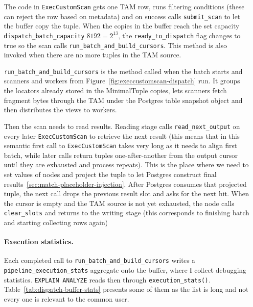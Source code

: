 \endgroup

The code in \texttt{ExecCustomScan} gets one TAM row, runs filtering conditions (these can reject the row based on metadata) and on success calls \texttt{submit\_scan} to let the buffer copy the tuple.
When the copies in the buffer reach the set capacity \texttt{dispatch\_batch\_capacity} \(8192 = 2^{13}\), the \texttt{ready\_to\_dispatch} flag changes to true so the scan calls \texttt{run\_batch\_and\_build\_cursors}.
This method is also invoked when there are no more tuples in the TAM source.

\texttt{run\_batch\_and\_build\_cursors} is the method called when the batch starts and scanners and workers from Figure~\ref{fig:execcustomscan-dispatch} run.
It groups the locators already stored in the MinimalTuple copies, lets scanners fetch fragment bytes through the TAM under the Postgres table snapshot object and then distributes the views to workers.

Then the scan needs to read results. Reading stage calls \texttt{read\_next\_output} on every later \texttt{ExecCustomScan} to retrieve the next result (this means that in this semantic first call to \texttt{ExecCustomScan} takes very long as it needs to align first batch, while later calls return tuples one-after-another from the output cursor until they are exhausted and process repeats).
This is the place where we need to set values of nodes and project the tuple to let Postgres construct final results~\ref{sec:match-placeholder-injection}.
After Postgres consumes that projected tuple, the next call drops the previous result slot and asks for the next hit.
When the cursor is empty and the TAM source is not yet exhausted, the node calls \texttt{clear\_slots} and returns to the writing stage (this corresponds to finishing batch and starting collecting rows again)

\paragraph{Execution statistics.}
Each completed call to \texttt{run\_\allowbreak{}batch\_\allowbreak{}and\_\allowbreak{}build\_\allowbreak{}cursors} writes a\linebreak
\texttt{pipeline\_\allowbreak{}execution\_\allowbreak{}stats} aggregate onto the buffer, where I collect debugging statistics.
\texttt{EXPLAIN ANALYZE} reads then through \texttt{execution\_stats()}.
Table~\ref{tab:dispatch-buffer-stats} presents some of them as the list is long and not every one is relevant to the common user.

